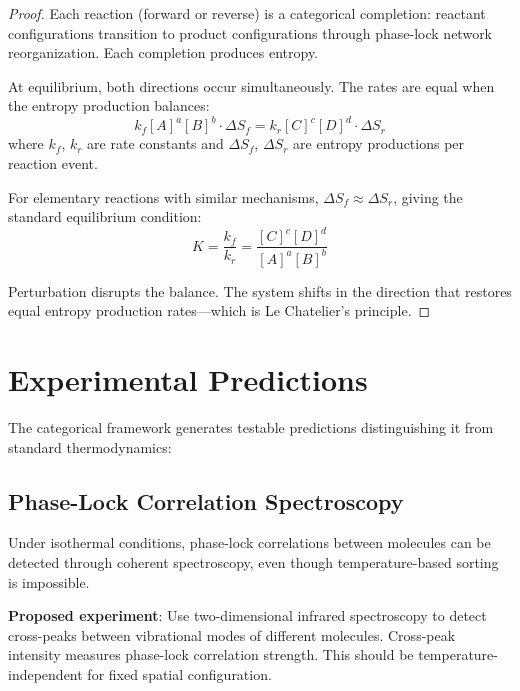 \documentclass[twocolumn,showpacs,preprintnumbers,amsmath,amssymb,prd]{revtex4-2}
\theoremstyle{definition}
\theoremstyle{remark}
\begin{document}
\begin{proof}
Each reaction (forward or reverse) is a categorical completion: reactant configurations transition to product configurations through phase-lock network reorganization. Each completion produces entropy.

At equilibrium, both directions occur simultaneously. The rates are equal when the entropy production balances:
\begin{equation}
k_f [A]^a [B]^b \cdot \Delta S_f = k_r [C]^c [D]^d \cdot \Delta S_r
\end{equation}
where $k_f$, $k_r$ are rate constants and $\Delta S_f$, $\Delta S_r$ are entropy productions per reaction event.

For elementary reactions with similar mechanisms, $\Delta S_f \approx \Delta S_r$, giving the standard equilibrium condition:
\begin{equation}
K = \frac{k_f}{k_r} = \frac{[C]^c [D]^d}{[A]^a [B]^b}
\end{equation}

Perturbation disrupts the balance. The system shifts in the direction that restores equal entropy production rates---which is Le Chatelier's principle.
\end{proof}

\section{Experimental Predictions}
\label{sec:experimental}

The categorical framework generates testable predictions distinguishing it from standard thermodynamics:

\subsection{Phase-Lock Correlation Spectroscopy}

\begin{prediction}
Under isothermal conditions, phase-lock correlations between molecules can be detected through coherent spectroscopy, even though temperature-based sorting is impossible.
\end{prediction}

\textbf{Proposed experiment}: Use two-dimensional infrared spectroscopy to detect cross-peaks between vibrational modes of different molecules. Cross-peak intensity measures phase-lock correlation strength. This should be temperature-independent for fixed spatial configuration.
\end{document}
